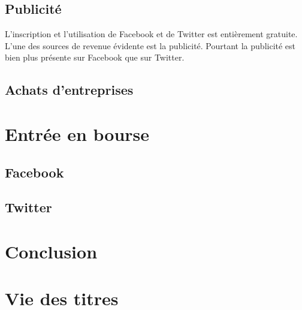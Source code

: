\documentclass[a4paper,10pt]{article}
\begin{document}
\subsection{Publicité}

L'inscription et l'utilisation de Facebook et de Twitter est entièrement gratuite. L'une des sources de revenue évidente est la publicité. Pourtant la publicité est bien plus présente sur Facebook que sur Twitter.



\subsection{Achats d'entreprises}



\section{Entrée en bourse}

\subsection{Facebook}
\subsection{Twitter}

\section{Conclusion}

\section{Vie des titres}


\clearpage
\end{document}

